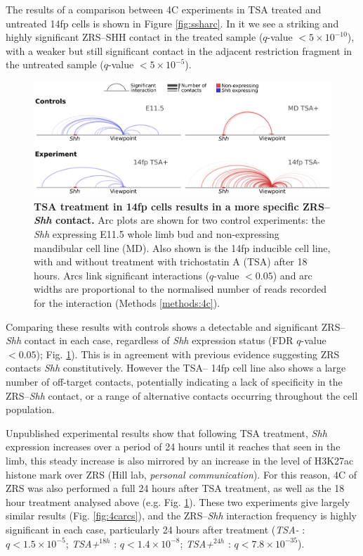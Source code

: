 \documentclass[a4paper,11pt,oneside]{book}
\begin{document}
The results of a comparison between 4C experiments in TSA treated and untreated 14fp cells is shown in Figure \ref{fig:ssharc}. In it we see a striking and highly significant ZRS--SHH contact in the treated sample ($q$-value $ < 5 \times 10^{-10}$), with a weaker but still significant contact in the adjacent restriction fragment in the untreated sample ($q$-value $ < 5 \times 10^{-5}$). 

\begin{figure}
\begin{center} 
\includegraphics[width=5.5in]{figs/4c_4way.pdf}
\captionsetup{width=\textwidth} 
\caption[ TSA treatment in 14fp cells results in a more specific ZRS--\emph{Shh} contact. ]{ {\bf TSA treatment in 14fp cells results in a more specific ZRS--\emph{Shh} contact. }
Arc plots are shown for two control experiments: the \emph{Shh} expressing E11.5 whole limb bud and non-expressing mandibular cell line (MD). Also shown is the 14fp inducible cell line, with and without treatment with trichostatin A (TSA) after 18 hours. Arcs link significant interactions ($q$-value $< 0.05$) and arc widths are proportional to the normalised number of reads recorded for the interaction (Methods \ref{methods:4c}).
}\label{fig:4c4way}
\end{center} 
\end{figure} 

Comparing these results with controls shows a detectable and significant ZRS--\emph{Shh} contact in each case, regardless of \emph{Shh} expression status (FDR $q$-value $ < 0.05$); Fig. \ref{fig:4c4way}). This is in agreement with previous evidence suggesting ZRS contacts \emph{Shh} constitutively.\cite{Bouwman2015a} However the TSA-- 14fp cell line also shows a large number of off-target contacts, potentially indicating a lack of specificity in the ZRS--\emph{Shh} contact, or a range of alternative contacts occurring throughout the cell population.

Unpublished experimental results show that following TSA treatment, \emph{Shh} expression increases over a period of 24 hours until it reaches that seen in the limb, this steady increase is also mirrored by an increase in the level of H3K27ac histone mark over ZRS (Hill lab, \emph{personal communication}). For this reason, 4C of ZRS was also performed a full 24 hours after TSA treatment, as well as the 18 hour treatment analysed above (e.g. Fig. \ref{fig:4c4way}). These two experiments give largely similar results (Fig. \ref{fig:4carcs}), and the ZRS--\emph{Shh} interaction frequency is highly significant in each case, particularly 24 hours after treatment (\emph{TSA-} : $ q < 1.5 \times 10^{-5}$; \emph{TSA+}$^{18h}$ : $q < 1.4 \times 10^{-8}$; \emph{TSA+}$^{24h}$ : $ q < 7.8 \times 10^{-35}$).
\end{document}
